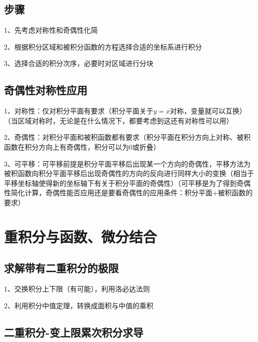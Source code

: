 \subsection{步骤}

1、先考虑对称性和奇偶性化简

2、根据积分区域和被积分函数的方程选择合适的坐标系进行积分

3、选择合适的积分次序，必要时对区域进行分块



\subsection{奇偶性对称性应用}

1、对称性：仅对积分平面有要求（积分平面关于$ y=x $对称，变量就可以互换）（当区域对称时，无论是在什么情况下，都要考虑到这还有对称性可以用）

2、奇偶性：对积分平面和被积函数都有要求（积分平面在积分方向上对称、被积函数在积分方向上有奇偶性，积分可以为0或折叠）

3、可平移：可平移前提是积分平面平移后出现某一个方向的奇偶性，平移方法为被积函数向积分平面平移后出现奇偶性的方向的反向进行同样大小的变换（相当于平移坐标轴使得新的坐标轴下有关于积分平面的奇偶性）（可平移是为了得到奇偶性简化计算，奇偶性能否应用还是要看奇偶性的应用条件：积分平面+被积函数的要求）

\section{重积分与函数、微分结合}



\subsection{求解带有二重积分的极限}

1、交换积分上下限（有可能），利用洛必达法则

2、利用积分中值定理，转换成面积与中值的乘积



\subsection{二重积分-变上限累次积分求导}

